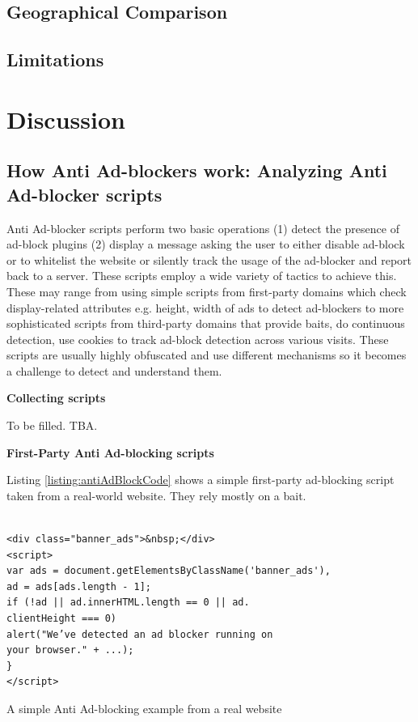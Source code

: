 \documentclass[runningheads,a4paper]{llncs}
\begin{document}
\subsection{Geographical Comparison}
    
\subsection{Limitations}
    
\section{Discussion}

\subsection{How Anti Ad-blockers work: Analyzing Anti Ad-blocker scripts}

Anti Ad-blocker scripts perform two basic operations (1) detect the presence of ad-block plugins (2) display a message asking the user to either disable ad-block or to whitelist the website or silently track the usage of the ad-blocker and report back to a server. These scripts employ a wide variety of tactics to achieve this. These may range from using simple scripts from first-party domains which check display-related attributes e.g. height, width of ads to detect ad-blockers to more sophisticated scripts from third-party domains that provide baits, do continuous detection, use cookies to track ad-block detection across various visits. These scripts are usually highly obfuscated and use different mechanisms so it becomes a challenge to detect and understand them.

\textbf{Collecting scripts}

To be filled. TBA.

\textbf{First-Party Anti Ad-blocking scripts}

Listing \ref{listing:antiAdBlockCode} shows a simple first-party ad-blocking script taken from a real-world website. They rely mostly on a bait.

\begin{listing}[!h]
\begin{verbatim}
               
<div class="banner_ads">&nbsp;</div>
<script>
var ads = document.getElementsByClassName('banner_ads'),
ad = ads[ads.length - 1];
if (!ad || ad.innerHTML.length == 0 || ad.
clientHeight === 0)
alert("We’ve detected an ad blocker running on
your browser." + ...);
}
</script>
\end{verbatim}
\caption{A simple Anti Ad-blocking example from a real website}
\label{listing:antiAdBlockCode}
\end{listing}
\end{document}
